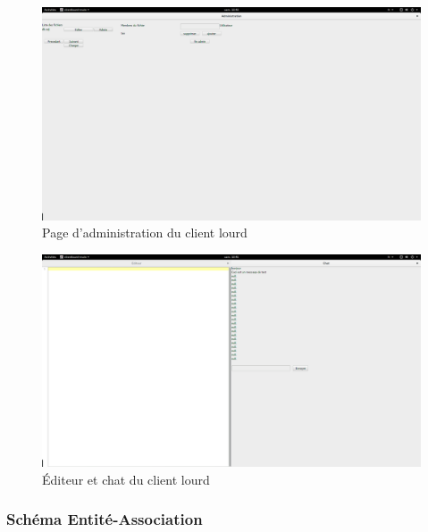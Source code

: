 \documentclass[a4paper, 12pt]{article}
\begin{document}
\begin{figure}[H]
  \begin{center}
    \includegraphics[scale=0.2]{admin_lourd}
  \end{center}
  \caption{Page d'administration du client lourd}
\end{figure}

\begin{figure}[H]
  \begin{center}
    \includegraphics[scale=0.2]{editeur_lourd.png}
  \end{center}
  \caption{Éditeur et chat du client lourd}
\end{figure}


\subsubsection{Schéma Entité-Association}
\end{document}
